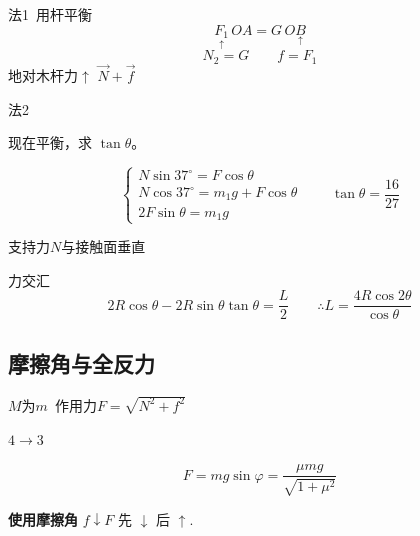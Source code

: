 \begin{problem}[6]
\begin{solution}
法1\ 用杆平衡 %
\[ \underset{\uparrow}{F_1}\,OA=G\,O\underset{\uparrow}{B} \] %
\[ N_2=G\qquad f=F_1 \]
地对木杆力$\uparrow$ $\vec N+\vec f$


法2\  %
\end{solution}
\end{problem}

\begin{problem}
现在平衡，求 $\tan\theta$。
\begin{solution}
\[
\begin{cases}
N\sin37^\circ=F\cos\theta\\
N\cos37^\circ=m_1g+F\cos\theta\\
2F\sin\theta=m_1g
\end{cases}
\qquad \tan\theta=\dfrac{16}{27}
\]
\end{solution}
\end{problem}

支持力$N$与接触面垂直

力交汇%
\[
2R\cos\theta-2R\sin\theta\tan\theta=\frac{L}{2}\qquad \therefore L=\frac{4R\cos2\theta}{\cos\theta}
\]

\subsection{摩擦角与全反力}
$M$为$m$\ 作用力\quad $F=\sqrt{N^2+f^2}$ %

$4\to3$


\[
F=mg\sin\varphi=\frac{\mu mg}{\sqrt{1+\mu^2}}
\]

\textbf{使用摩擦角}
$f\downarrow$\quad $F$ 先 $\downarrow$ 后 $\uparrow$.

